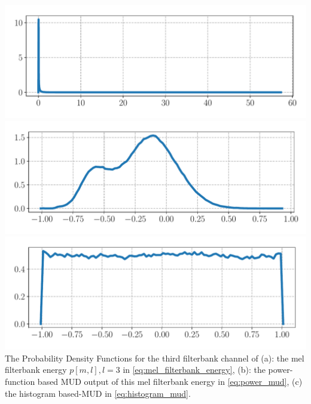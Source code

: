 \documentclass[a0,portrait]{a0poster}
\newenvironment{Figure}
  {\par\medskip\noindent\minipage{\linewidth}}
  {\endminipage\par\medskip}
\begin{document}
\begin{multicols}{2}
\begin{Figure}
  \begin{center}
    {
      \includegraphics[width=170mm]{mel_filterbank_energy_histogram}
      \label{fig:mel_filterbank_energy_histogram}
    }   
    \\  
    {
      \includegraphics[width=170mm]{power_function_based_mud_output_histogram}
      \label{fig:power_function_based_mud_output_histogram}
    }   
  \vspace{-2mm}
    \\  
    {
      \includegraphics[width=170mm]{histogram_based_mud_output_histogram}
      \label{fig:histogram_based_mud_output_histogram}
    }   
  \vspace{-2mm}
     {
      The Probability Density Functions for the third filterbank channel
       of (a): the mel filterbank energy $p[m, l], l = 3$ in  
       \eqref{eq:mel_filterbank_energy}, (b): the power-function based MUD 
      output of this mel filterbank energy in \eqref{eq:power_mud}, (c) 
      the histogram based-MUD in \eqref{eq:histogram_mud}. 
      \label{fig:pdf_mud}
    }   
   \vspace{-7mm}
  \end{center}
\end{Figure}




\end{multicols}
\end{document}
